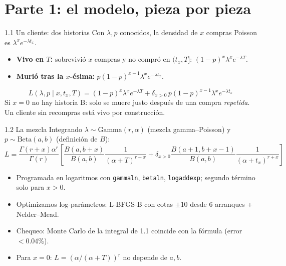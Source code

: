 \documentclass[aspectratio=169,10pt]{beamer}
\begin{document}
\section{Parte 1: el modelo, pieza por pieza}

\begin{frame}{1.1 Un cliente: dos historias}
Con $\lambda,p$ conocidos, la densidad de $x$ compras Poisson es $\lambda^x e^{-\lambda t_x}$.
\begin{itemize}
  \item \textbf{Vivo en $T$:} sobrevivió $x$ compras y no compró en $(t_x,T]$: $(1-p)^x\lambda^xe^{-\lambda T}$.
  \item \textbf{Murió tras la $x$-ésima:} $p(1-p)^{x-1}\lambda^xe^{-\lambda t_x}$.
\end{itemize}
\[L(\lambda,p\mid x,t_x,T)=(1-p)^x\lambda^xe^{-\lambda T}+\delta_{x>0}\,p(1-p)^{x-1}\lambda^xe^{-\lambda t_x}\]
\alert{Si $x=0$ no hay historia B}: solo se muere justo después de una compra \emph{repetida}. Un cliente sin recompras está vivo por construcción.
\end{frame}

\begin{frame}{1.2 La mezcla}
Integrando $\lambda\sim\text{Gamma}(r,\alpha)$ (mezcla gamma–Poisson) y $p\sim\text{Beta}(a,b)$ (definición de $B$):
\[
L=\frac{\Gamma(r+x)\alpha^r}{\Gamma(r)}\left[\frac{B(a,b+x)}{B(a,b)}\frac{1}{(\alpha+T)^{r+x}}+\delta_{x>0}\frac{B(a+1,b+x-1)}{B(a,b)}\frac{1}{(\alpha+t_x)^{r+x}}\right]
\]
\begin{itemize}
  \item Programada en logaritmos con \texttt{gammaln}, \texttt{betaln}, \texttt{logaddexp}; segundo término solo para $x>0$.
  \item Optimizamos log-parámetros: L-BFGS-B con cotas $\pm10$ desde 6 arranques + Nelder–Mead.
  \item Chequeo: Monte Carlo de la integral de 1.1 coincide con la fórmula (error $<0.04\%$).
  \item Para $x=0$: $L=(\alpha/(\alpha+T))^r$ \alert{no depende de $a,b$}.
\end{itemize}
\end{frame}
\end{document}
